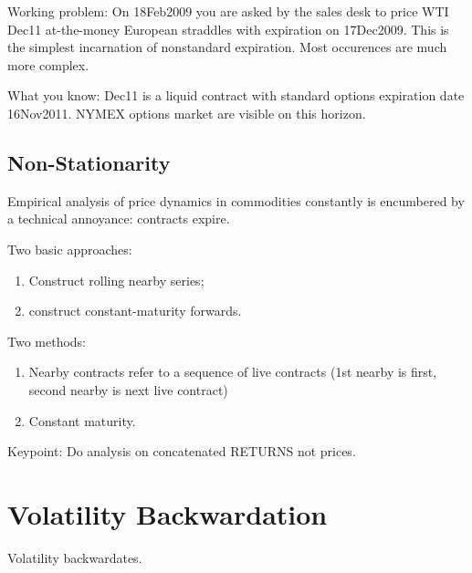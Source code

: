 Working problem: On 18Feb2009 you are asked by the sales desk to price WTI Dec11 at-the-money European straddles with expiration on 17Dec2009. This is the simplest incarnation of nonstandard expiration. Most occurences are much more complex.

What you know: Dec11 is a liquid contract with standard options expiration date 16Nov2011. NYMEX options market are visible on this horizon.

\subsection{Non-Stationarity}
Empirical analysis of price dynamics in commodities constantly is encumbered by a technical annoyance: contracts expire.

Two basic approaches:
\begin{enumerate}
	\item Construct rolling nearby series; 
	\item construct constant-maturity forwards.
\end{enumerate}

Two methods:
\begin{enumerate}
	\item Nearby contracts refer to a sequence of live contracts (1st nearby is first, second nearby is next live contract)
	\item Constant maturity.
\end{enumerate}

Keypoint: Do analysis on concatenated RETURNS not prices.

\section{Volatility Backwardation}
Volatility backwardates.


















